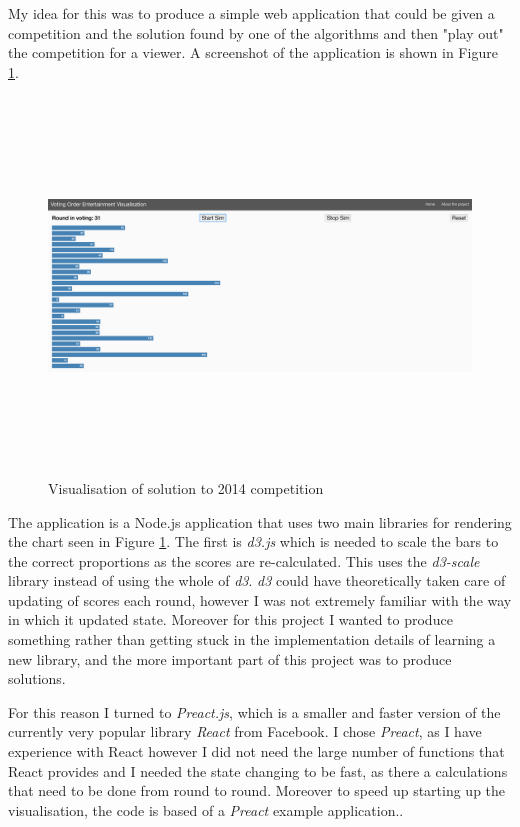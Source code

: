\documentclass[12pt]{report}
\begin{document}
My idea for this was to produce a simple web application that could be given a competition and the solution found by one of the algorithms and then "play out" the competition for a viewer. A screenshot of the application is shown in Figure \ref{visScreenshot}.

\begin{figure}[H]
\centering
\includegraphics[width=17cm, height=10cm]{./visualisation}
\caption{Visualisation of solution to 2014 competition}
\label{visScreenshot}
\end{figure}

The application is a Node.js application that uses two main libraries for rendering the chart seen in Figure \ref{visScreenshot}. The first is \textit{d3.js} which is needed to scale the bars to the correct proportions as the scores are re-calculated. This uses the \textit{d3-scale} library\cite{d3} instead of using the whole of \textit{d3}. \textit{d3} could have theoretically taken care of updating of scores each round, however I was not extremely familiar with the way in which it updated state. Moreover for this project I wanted to produce something rather than getting stuck in the implementation details of learning a new library, and the more important part of this project was to produce solutions.

For this reason I turned to \textit{Preact.js}\cite{Preact}, which is a smaller and faster version of the currently very popular library \textit{React}\cite{React} from Facebook. I chose \textit{Preact}, as I have experience with React however I did not need the large number of functions that React provides and I needed the state changing to be fast, as there a calculations that need to be done from round to round. Moreover to speed up starting up the visualisation, the code is based of a \textit{Preact} example application.\cite{PreactBoilerplate}.
\end{document}
